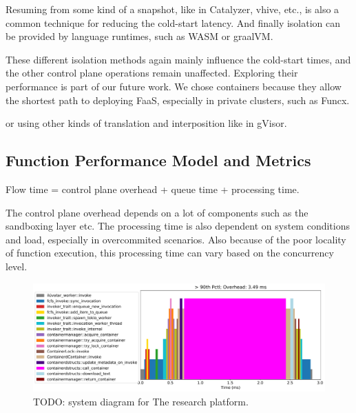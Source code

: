 Resuming from some kind of a snapshot, like in Catalyzer, vhive, etc., is also a common technique for reducing the cold-start latency.
And finally isolation can be provided by language runtimes, such as WASM or graalVM.

These different isolation methods again mainly influence the cold-start times, and the other control plane operations remain unaffected. Exploring their performance is part of our future work.
We chose containers because they allow the shortest path to deploying FaaS, especially in private clusters, such as Funcx. 


or using other kinds of translation and interposition like in gVisor.




\subsection{Function Performance Model and Metrics}
Flow time = control plane overhead + queue time + processing time.

The control plane overhead depends on a lot of components such as the sandboxing layer etc.
The processing time is also dependent on system conditions and load, especially in overcommited scenarios.
Also because of the poor locality of function execution, this processing time can vary based on the concurrency level.


\begin{figure} \includegraphics[width=\columnwidth]{../graphs/timelines/0-e1bc39-timeline.pdf}
    \caption{TODO: system diagram for The \sysname{} research platform.}
\end{figure}


